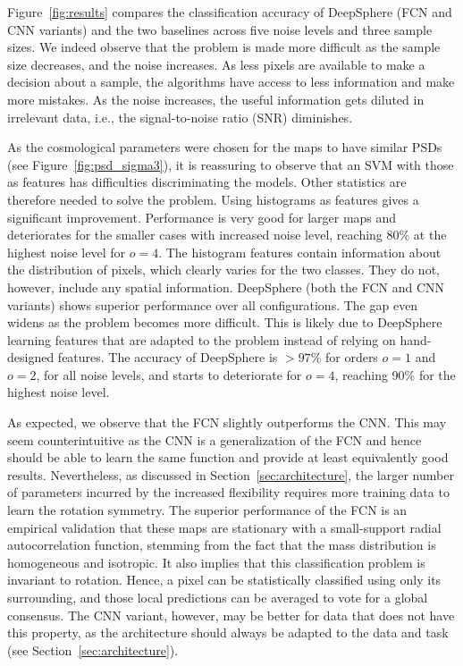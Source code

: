 \documentclass[final,twocolumn,3p,times,sort&compress]{elsarticle}
\newcommand{\figref}[1]{Figure~\ref{fig:#1}}
\newcommand{\secref}[1]{Section~\ref{sec:#1}}
\newcommand{\1}{\b{1}}              %
\newcommand{\0}{\b{0}}              %
\begin{document}
\figref{results} compares the classification accuracy of DeepSphere (FCN and CNN variants) and the two baselines across five noise levels and three sample sizes.
We indeed observe that the problem is made more difficult as the sample size decreases, and the noise increases.
As less pixels are available to make a decision about a sample, the algorithms have access to less information and make more mistakes.
As the noise increases, the useful information gets diluted in irrelevant data, i.e., the signal-to-noise ratio (SNR) diminishes.

As the cosmological parameters were chosen for the maps to have similar PSDs (see \figref{psd_sigma3}), it is reassuring to observe that an SVM with those as features has difficulties discriminating the models.
Other statistics are therefore needed to solve the problem. Using histograms as features gives a significant improvement.
Performance is very good for larger maps and deteriorates for the smaller cases with increased noise level, reaching 80\% at the highest noise level for $o=4$.
The histogram features contain information about the distribution of pixels, which clearly varies for the two classes.
They do not, however, include any spatial information.
DeepSphere (both the FCN and CNN variants) shows superior performance over all configurations.
The gap even widens as the problem becomes more difficult.
This is likely due to DeepSphere learning features that are adapted to the problem instead of relying on hand-designed features.
The accuracy of DeepSphere is $>97\%$ for orders $o=1$ and $o=2$, for all noise levels, and starts to deteriorate for $o=4$, reaching 90\% for the highest noise level.

As expected, we observe that the FCN slightly outperforms the CNN.
This may seem counterintuitive as the CNN is a generalization of the FCN and hence should be able to learn the same function and provide at least equivalently good results.
Nevertheless, as discussed in \secref{architecture}, the larger number of parameters incurred by the increased flexibility requires more training data to learn the rotation symmetry.
The superior performance of the FCN is an empirical validation that these maps are stationary with a small-support radial autocorrelation function, stemming from the fact that the mass distribution is homogeneous and isotropic.
It also implies that this classification problem is invariant to rotation.
Hence, a pixel can be statistically classified using only its surrounding, and those local predictions can be averaged to vote for a global consensus.
The CNN variant, however, may be better for data that does not have this property, as the architecture should always be adapted to the data and task (see \secref{architecture}).
\end{document}
